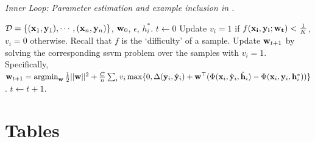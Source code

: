 \documentclass{article}
\newcommand{\mysection}[1]{\vspace{-4mm}\section{#1}\vspace{-4mm}}
\newcommand{\mytopcaption}[1]{\caption{\em \footnotesize #1}}
\newcommand{\argmin}{\operatornamewithlimits{argmin}}
\begin{document}
\begin{algorithm}[h!]
\mytopcaption{Inner Loop: Parameter estimation and example inclusion in \sc{SPL}.}
\label{algo:latentSSVM}
\begin{algorithmic}[1]
\INPUT ${\cal D} = \{({\bf x}_1,{\bf y}_1),\cdots,({\bf x}_n,{\bf y}_n)\}$, ${\bf w}_0$, $\epsilon$, $h_i^*$.
\STATE $t \leftarrow 0$
\REPEAT
\STATE Update $v_i = 1$ if $f({\bf x_i, \bf y_i;\bf w_t}) < \frac{1}{K}$, $v_i=0$ otherwise.  Recall that $f$ is the `difficulty' of a sample.
\STATE Update ${\bf w}_{t+1}$ by solving the corresponding
{\sc ssvm} problem over the samples with $v_i=1$. Specifically, \\
${\bf w}_{t+1} = \argmin_{\bf w} \frac{1}{2}||{\bf w}||^2 + \frac{C}{n}\sum_{i} v_i\max\{0,\Delta({\bf y}_i,\hat{\bf y}_i) +
		{\bf w}^\top (\Phi({\bf x}_i,\hat{\bf y}_i,\hat{\bf h}_i) - \Phi({\bf x}_i,{\bf y}_i,{\bf h}_i^*))\}$.
\STATE $t \leftarrow t + 1$.
\end{algorithmic}
\end{algorithm}


\newpage

\mysection{Tables}
\label{sec:tables}
\end{document}
